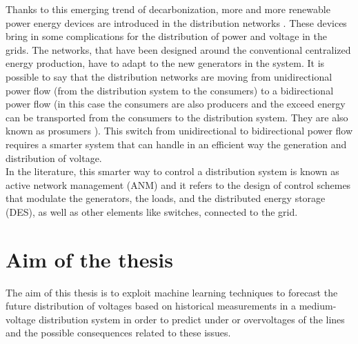 Thanks to this emerging trend of decarbonization, more and more renewable power energy devices are introduced in the distribution networks \cite{owidenergy}. These devices bring in some complications for the distribution of power and voltage in the grids. The networks, that have been designed around the conventional centralized energy production, have to adapt to the new generators in the system. It is possible to say that the distribution networks are moving from unidirectional power flow (from the distribution system to the consumers) to a bidirectional power flow (in this case the consumers are also producers and the exceed energy can be transported from the consumers to the distribution system. They are also known as prosumers \cite{prosumers}). This switch from unidirectional to bidirectional power flow requires a smarter system that can handle in an efficient way the generation and distribution of voltage.\\

In the literature, this smarter way to control a distribution system is known as active network management (\gls{ANM}) and it refers to the design of control schemes that modulate the generators, the loads, and the distributed energy storage (\gls{DES}), as well as other elements like switches, connected to the grid. \\


\section{Aim of the thesis}
\label{sec:aimthesis}
The aim of this thesis is to exploit machine learning techniques to forecast the future distribution of voltages based on historical measurements in a medium-voltage distribution system in order to predict under or overvoltages of the lines and the possible consequences related to these issues. 



